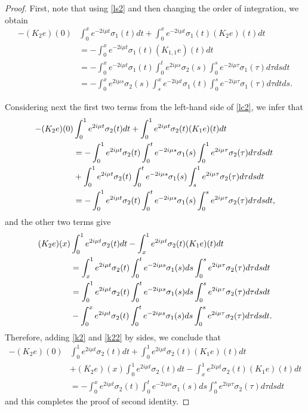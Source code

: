 \documentclass[11pt]{amsart}
\theoremstyle{plain}
\theoremstyle{definition}
\theoremstyle{remark}
\numberwithin{equation}{section}
\begin{document}
\begin{proof}
First, note that using \eqref{ls2} and then changing the order of integration, we obtain
\begin{align*}
-(K_2e)(0)&\int_0^xe^{-2i \mu t}\sigma_1(t) dt
+\int_0^xe^{-2i \mu t}\sigma_1(t)(K_2e)(t) dt\\
&=
-\int_0^xe^{-2i \mu t}\sigma_1(t)(K_{1,1}e)(t) dt\\
&=-\int_0^xe^{-2i \mu t}\sigma_1(t) \int_0^te^{2i \mu s}\sigma_2(s)\int_0^se^{-2i \mu \tau}\sigma_1(\tau) d\tau ds dt\\
&=-\int_0^xe^{2i \mu s}\sigma_2(s) \int_s^xe^{-2i \mu t}\sigma_1(t)\int_0^se^{-2i \mu \tau}\sigma_1(\tau) d\tau dt ds.
\end{align*}

Considering next  the first two terms from the left-hand side of \eqref{lc2}, we infer that
\begin{align}
-(K_2e)(0)&\int_0^1e^{2i \mu t}\sigma_2(t) dt
+\int_0^1e^{2i \mu t}\sigma_2(t)(K_1e)(t) dt\notag \\
&=-\int_0^1e^{2i \mu t}\sigma_2(t) \int_0^te^{-2i \mu s}\sigma_1(s)\int_0^1e^{2i \mu \tau}\sigma_2(\tau) d\tau ds dt\label {k2}\\
&+\int_0^1e^{2i \mu t}\sigma_2(t) \int_0^te^{-2i \mu s}\sigma_1(s)\int_s^1e^{2i \mu \tau}\sigma_2(\tau) d\tau ds dt\notag \\
&=-\int_0^1e^{2i \mu t}\sigma_2(t) \int_0^te^{-2i \mu s}\sigma_1(s)\int_0^se^{2i \mu \tau}\sigma_2(\tau) d\tau ds dt,\notag
\end{align}
and the other two terms give
\begin{align}
(K_2e)(x)&\int_0^1e^{2i \mu t}\sigma_2(t) dt
-\int_x^1e^{2i \mu t}\sigma_2(t)(K_1e)(t) dt\notag \\
&=\int_x^1e^{2i \mu t}\sigma_2(t) \int_0^te^{-2i \mu s}\sigma_1(s)ds\int_0^se^{2i \mu \tau}\sigma_2(\tau) d\tau ds dt\label{k22} \\
&=\int_0^1e^{2i \mu t}\sigma_2(t) \int_0^te^{-2i \mu s}\sigma_1(s)ds\int_0^se^{2i \mu \tau}\sigma_2(\tau) d\tau ds dt\notag \\
&-\int_0^xe^{2i \mu t}\sigma_2(t) \int_0^te^{-2i \mu s}\sigma_1(s)ds\int_0^se^{2i \mu \tau}\sigma_2(\tau) d\tau ds dt.\notag
\end{align}
Therefore, adding \eqref{k2} and \eqref{k22} by sides, we conclude that
\begin{align*}
-(K_2e)(0)&\int_0^1e^{2i \mu t}\sigma_2(t) dt
+\int_0^1e^{2i \mu t}\sigma_2(t)(K_1e)(t) dt\\
&+(K_2e)(x)\int_0^1e^{2i \mu t}\sigma_2(t) dt
-\int_x^1e^{2i \mu t}\sigma_2(t)(K_1e)(t) dt\\
&=-\int_0^xe^{2i \mu t}\sigma_2(t) \int_0^te^{-2i \mu s}\sigma_1(s)ds\int_0^se^{2i \mu \tau}\sigma_2(\tau) d\tau ds dt
\end{align*}
and this completes the proof of second identity.
\end{proof}
\end{document}
